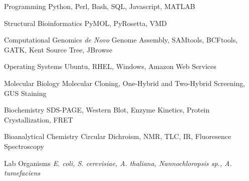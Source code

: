 \vspace{2mm}


\begin{cvskills}

  \cvskill
    {Programming} %
    {Python, Perl, Bash, SQL, Javascript, MATLAB} %

  \cvskill
    {Structural Bioinformatics} %
    {PyMOL, PyRosetta, VMD} %

  \cvskill
    {Computational Genomics} %
    {\textit{de Novo} Genome Assembly, SAMtools, BCFtools, GATK, Kent Source Tree, JBrowse} %

  \cvskill
    {Operating Systems} %
    {Ubuntu, RHEL, Windows, Amazon Web Services} %

  \cvskill
    {Molecular Biology} %
    {Molecular Cloning, One-Hybrid and Two-Hybrid Screening, GUS Staining} %

  \cvskill
    {Biochemistry} %
    {SDS-PAGE, Western Blot, Enzyme Kinetics, Protein Crystallization, FRET} %

  \cvskill
    {Bioanalytical Chemistry} %
    {Circular Dichroism, NMR, TLC, IR, Fluoresence Spectroscopy} %

  \cvskill
    {Lab Organisms} %
    {\textit{E. coli, S. cerevisiae, A. thaliana, Nannochloropsis sp., A. tumefaciens}} %
    
\vspace{-8.0mm}
\end{cvskills}